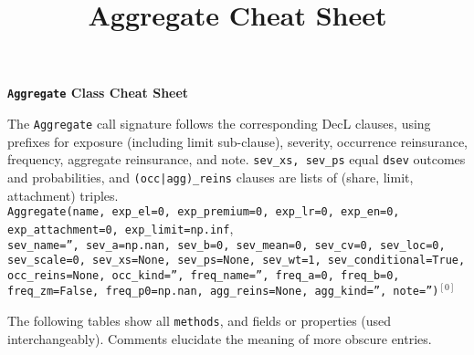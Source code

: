 \documentclass{article}
\title{Aggregate Cheat Sheet}
\begin{document}
{\huge{\bf \textbf{\texttt{Aggregate} Class Cheat Sheet}}}

\raggedright The \texttt{Aggregate} call signature follows the corresponding DecL clauses, using prefixes for exposure (including limit sub-clause), severity, occurrence reinsurance, frequency, aggregate reinsurance, and note. \texttt{sev\_xs, sev\_ps} equal \texttt{dsev} outcomes and probabilities, and \texttt{(occ|agg)\_reins} clauses are lists of (share, limit, attachment) triples. \\
 \texttt{\m Aggregate(name, exp\_el=0, exp\_premium=0, exp\_lr=0, exp\_en=0, exp\_attachment=0, exp\_limit=np.inf}, \\
 \texttt{\phantom{\m}sev\_name='', sev\_a=np.nan, sev\_b=0, sev\_mean=0, sev\_cv=0, sev\_loc=0, sev\_scale=0, sev\_xs=None, sev\_ps=None, sev\_wt=1, sev\_conditional=True, }\\
 \texttt{\phantom{\m}occ\_reins=None, occ\_kind='', freq\_name='', freq\_a=0, freq\_b=0, freq\_zm=False, freq\_p0=np.nan, agg\_reins=None, agg\_kind='', note='')}${}^{[0]}$

The following tables show all \texttt{\m methods}, and fields or properties (used interchangeably). Comments elucidate the meaning of more obscure entries.
\end{document}
